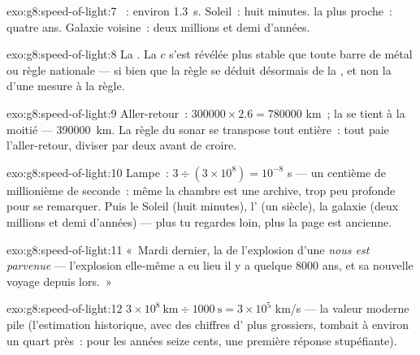 \begin{solution}{exo:g8:speed-of-light:7}
~: environ \qty{1.3}{s}. Soleil~: huit minutes.  la plus
proche~: quatre ans. Galaxie voisine~: deux millions et demi
d'années.
\end{solution}

\begin{solution}{exo:g8:speed-of-light:8}
La . La  $c$ s'est révélée plus stable que toute barre
de métal ou règle nationale --- si bien que la règle se déduit
désormais de la , et non la  d'une mesure à la règle.
\end{solution}

\begin{solution}{exo:g8:speed-of-light:9}
Aller-retour~: $300000 \times 2.6 = 780000$ km~; la  se tient à
la moitié --- \qty{390000}{km}. La règle du sonar se transpose tout
entière~: tout  paie l'aller-retour, diviser par deux avant de
croire.
\end{solution}

\begin{solution}{exo:g8:speed-of-light:10}
Lampe~: $3 \div (3 \times 10^{8}) = 10^{-8}$ s --- un centième de
millionième de seconde~: même la chambre est une archive, trop peu
profonde pour se remarquer. Puis le Soleil (huit minutes), l'
(un siècle), la galaxie (deux millions et demi d'années) --- plus tu
regardes loin, plus la page est ancienne.
\end{solution}

\begin{solution}{exo:g8:speed-of-light:11}
«~Mardi dernier, la  de l'explosion d'une  \emph{nous est
parvenue} --- l'explosion elle-même a eu lieu il y a quelque $8000$
ans, et sa nouvelle voyage depuis lors.~»
\end{solution}

\begin{solution}{exo:g8:speed-of-light:12}
$3 \times 10^{8}\ \text{km} \div 1000\ \text{s} = 3 \times 10^{5}$
\unit{km/s} --- la valeur moderne pile (l'estimation historique, avec
des chiffres d' plus grossiers, tombait à environ un quart
près~: pour les années seize cents, une première réponse
stupéfiante).
\end{solution}

